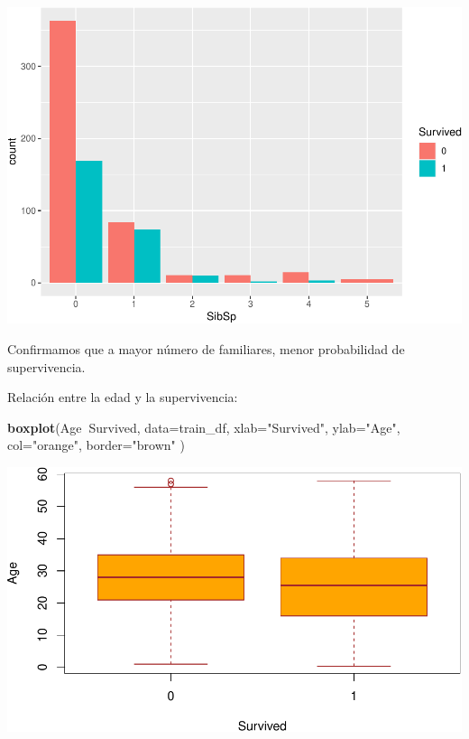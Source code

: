 \documentclass[]{article}
\newenvironment{Shaded}{\begin{snugshade}}{\end{snugshade}}
\newcommand{\DataTypeTok}[1]{\textcolor[rgb]{0.13,0.29,0.53}{#1}}
\newcommand{\KeywordTok}[1]{\textcolor[rgb]{0.13,0.29,0.53}{\textbf{#1}}}
\newcommand{\NormalTok}[1]{#1}
\newcommand{\OperatorTok}[1]{\textcolor[rgb]{0.81,0.36,0.00}{\textbf{#1}}}
\newcommand{\StringTok}[1]{\textcolor[rgb]{0.31,0.60,0.02}{#1}}
\begin{document}
\includegraphics{titanic_data_analysis_PRA2_files/figure-latex/unnamed-chunk-29-1.pdf}

Confirmamos que a mayor número de familiares, menor probabilidad de
supervivencia.

Relación entre la edad y la supervivencia:

\begin{Shaded}
\begin{Highlighting}[]
\KeywordTok{boxplot}\NormalTok{(Age}\OperatorTok{~}\NormalTok{Survived,}
\DataTypeTok{data=}\NormalTok{train_df,}
\DataTypeTok{xlab=}\StringTok{"Survived"}\NormalTok{,}
\DataTypeTok{ylab=}\StringTok{"Age"}\NormalTok{,}
\DataTypeTok{col=}\StringTok{"orange"}\NormalTok{,}
\DataTypeTok{border=}\StringTok{"brown"}
\NormalTok{)}
\end{Highlighting}
\end{Shaded}

\includegraphics{titanic_data_analysis_PRA2_files/figure-latex/unnamed-chunk-30-1.pdf}
\end{document}
